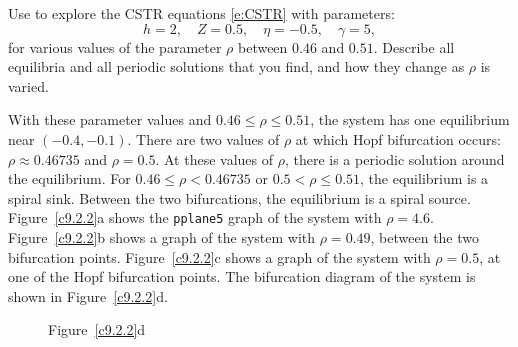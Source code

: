 \documentclass{ximera}
\begin{document}
\begin{exercise} \label{c9.2.2}
Use {\pplane} to explore the CSTR equations \eqref{e:CSTR} with
parameters:
\[
h=2, \quad Z=0.5, \quad \eta=-0.5, \quad \gamma=5,
\]
for various values of the parameter $\rho$ between $0.46$ and 
$0.51$.  Describe all equilibria and all periodic solutions that 
you find, and how they change as $\rho$ is varied.

\begin{solution}

With these parameter values and $0.46 \leq \rho \leq 0.51$, the system
has one equilibrium near $(-0.4,-0.1)$.  There are two values of $\rho$
at which Hopf bifurcation occurs: $\rho \approx 0.46735$ and
$\rho = 0.5$.  At these values of $\rho$, there is a periodic solution
around the equilibrium.  For $0.46 \leq \rho < 0.46735$ or $0.5 < \rho
\leq 0.51$, the equilibrium is a spiral sink.  Between the two
bifurcations, the equilibrium is a spiral source.  Figure~\ref{c9.2.2}a
shows the {\tt pplane5} graph of the system with $\rho = 4.6$. 
Figure~\ref{c9.2.2}b shows a graph of the system with $\rho = 0.49$,
between the two bifurcation points.  Figure~\ref{c9.2.2}c shows a graph
of the system with $\rho = 0.5$, at one of the Hopf bifurcation points.
The bifurcation diagram of the system is shown in Figure~\ref{c9.2.2}d.

\begin{figure}[htb]
                       \centerline{%
                       }
\end{figure}

\begin{figure}[htb]
			\centerline{%
			}
		\centerline{Figure~\ref{c9.2.2}d}
\end{figure}




\end{solution}
\end{exercise}
\end{document}

